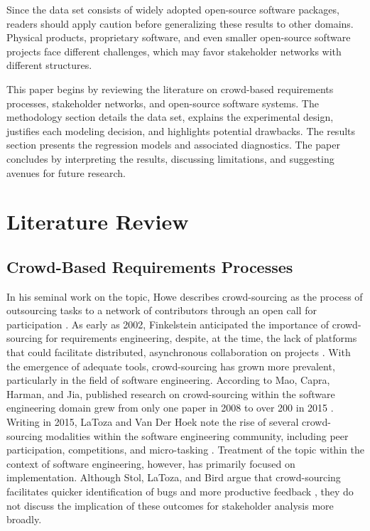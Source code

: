 Since the data set consists of widely adopted open-source software packages, readers should apply caution before generalizing these results to other domains. Physical products, proprietary software, and even smaller open-source software projects face different challenges, which may favor stakeholder networks with different structures.

This paper begins by reviewing the literature on crowd-based requirements processes, stakeholder networks, and open-source software systems. The methodology section details the data set, explains the experimental design, justifies each modeling decision, and highlights potential drawbacks. The results section presents the regression models and associated diagnostics. The paper concludes by interpreting the results, discussing limitations, and suggesting avenues for future research.

\section{Literature Review}
\label{litreview}

\subsection{Crowd-Based Requirements Processes}
\label{crowd_based_re}
In his seminal work on the topic, Howe describes crowd-sourcing as the process of outsourcing tasks to a network of contributors through an open call for participation \cite{howe, howe2}. As early as 2002, Finkelstein anticipated the importance of crowd-sourcing for requirements engineering, despite, at the time, the lack of platforms that could facilitate distributed, asynchronous collaboration on projects \cite{finkelstein}. With the emergence of adequate tools, crowd-sourcing has grown more prevalent, particularly in the field of software engineering. According to Mao, Capra, Harman, and Jia, published research on crowd-sourcing within the software engineering domain grew from only one paper in 2008 to over 200 in 2015 \cite{mao}. Writing in 2015, LaToza and Van Der Hoek note the rise of several crowd-sourcing modalities within the software engineering community, including peer participation, competitions, and micro-tasking \cite{latoza}. Treatment of the topic within the context of software engineering, however, has primarily focused on implementation. Although Stol, LaToza, and Bird argue that crowd-sourcing facilitates quicker identification of bugs and more productive feedback \cite{stol}, they do not discuss the implication of these outcomes for stakeholder analysis more broadly.
 
